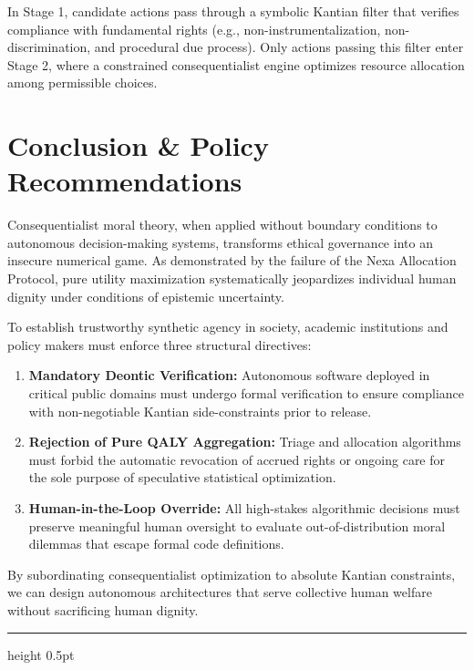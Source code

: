 \documentclass[11pt,a4paper]{article}
\begin{document}
In Stage 1, candidate actions pass through a symbolic Kantian filter that verifies compliance with fundamental rights (e.g., non-instrumentalization, non-discrimination, and procedural due process). Only actions passing this filter enter Stage 2, where a constrained consequentialist engine optimizes resource allocation among permissible choices.

\section{Conclusion \& Policy Recommendations}

Consequentialist moral theory, when applied without boundary conditions to autonomous decision-making systems, transforms ethical governance into an insecure numerical game. As demonstrated by the failure of the Nexa Allocation Protocol, pure utility maximization systematically jeopardizes individual human dignity under conditions of epistemic uncertainty.

To establish trustworthy synthetic agency in society, academic institutions and policy makers must enforce three structural directives:
\begin{enumerate}[label=\arabic*., leftmargin=1.8em, itemsep=0.01em]
    \item \textbf{Mandatory Deontic Verification:} Autonomous software deployed in critical public domains must undergo formal verification to ensure compliance with non-negotiable Kantian side-constraints prior to release.
    \item \textbf{Rejection of Pure QALY Aggregation:} Triage and allocation algorithms must forbid the automatic revocation of accrued rights or ongoing care for the sole purpose of speculative statistical optimization.
    \item \textbf{Human-in-the-Loop Override:} All high-stakes algorithmic decisions must preserve meaningful human oversight to evaluate out-of-distribution moral dilemmas that escape formal code definitions.
\end{enumerate}

By subordinating consequentialist optimization to absolute Kantian constraints, we can design autonomous architectures that serve collective human welfare without sacrificing human dignity.

\vspace{0.15em}
\hrule height 0.5pt \color{bordergray}
\vspace{0.15em}
\end{document}
